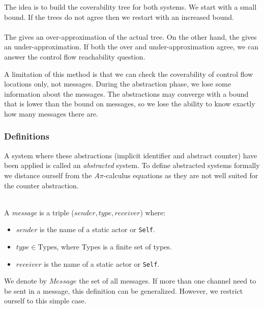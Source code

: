 \documentclass[a4paper]{report}
\numberwithin{algorithm}{chapter}
\begin{document}
The idea is to build the coverability tree \cite{DBLP:journals/jcss/KarpM69,DBLP:conf/apn/Finkel91} for both systems.
We start with a small bound.
If the trees do not agree then we restart with an increased bound.

\paragraph{}
The \iabs{} gives an over-approximation of the actual tree.
On the other hand, the \dabs{} gives an under-approximation.
If both the over and under-approximation agree, we can answer the control flow reachability question.

A limitation of this method is that we can check the coverability of control flow locations only, not messages.
During the abstraction phase, we lose some information about the messages.
The abstractions may converge with a bound that is lower than the bound on messages, so we lose the ability to know exactly how many messages there are.


\subsubsection{Definitions}
A system where these abstractions (implicit identifier and abstract counter) have been applied is called an \emph{abstracted} system.
To define abstracted systems formally we distance ourself from the $A\pi$-calculus equations as they are not well suited for the counter abstraction.

\begin{define}[Message] \mbox{}\\
A \emph{message} is a triple ($\mathit{sender}, \mathit{type}, \mathit{receiver}$) where:
\begin{itemize}
\item $\mathit{sender}$ is the name of a static actor or \texttt{Self}.
\item $\mathit{type} \in \text{Types}$, where Types is a finite set of types.
\item $\mathit{receiver}$ is the name of a static actor or \texttt{Self}.
\end{itemize}
\end{define}
We denote by $\mathit{Message}$ the set of all messages.
If more than one channel need to be sent in a message, this definition can be generalized.
However, we restrict ourself to this simple case.
\end{document}
